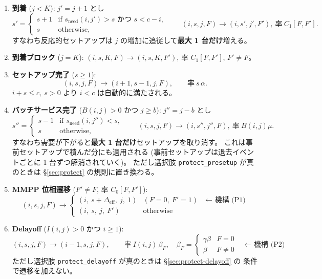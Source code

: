 \documentclass[a4paper,11pt]{article}
\newcommand{\code}[1]{\texttt{#1}}
\newcommand{\eff}{\mathrm{eff}}
\begin{document}
\begin{enumerate}
\item \textbf{到着} ($j<K$): $j'=j+1$ とし
  \begin{equation}
    s' = \begin{cases}
      s+1 & \text{if } s_{\mathrm{need}}(i,j')>s \text{ かつ } s<c-i,\\
      s   & \text{otherwise,}
    \end{cases}
    \qquad
    (i,s,j,F)\to(i,s',j',F'),\ \text{率}\ C_1[F,F'].
  \end{equation}
  すなわち反応的セットアップは $j$ の増加に追従して\textbf{最大 1 台だけ}増える。
\item \textbf{到着ブロック} ($j=K$): $(i,s,K,F)\to(i,s,K,F')$, 率 $C_1[F,F']$, $F'\ne F$。
\item \textbf{セットアップ完了} ($s\ge1$):
  \begin{equation}
    (i,s,j,F)\to(i+1,s-1,j,F),\qquad \text{率}\ s\,\alpha .
  \end{equation}
  $i+s\le c,\ s>0$ より $i<c$ は自動的に満たされる。
\item \textbf{バッチサービス完了} ($B(i,j)>0$ かつ $j\ge b$): $j''=j-b$ とし
  \begin{equation}
    s''=\begin{cases} s-1 & \text{if } s_{\mathrm{need}}(i,j'')<s,\\ s & \text{otherwise,}\end{cases}
    \qquad (i,s,j,F)\to(i,s'',j'',F),\ \text{率}\ B(i,j)\mu .
  \end{equation}
  すなわち需要が下がると\textbf{最大 1 台だけ}セットアップを取り消す。
  これは事前セットアップで積んだ分にも適用される
  (事前セットアップは退去イベントごとに 1 台ずつ解消されていく)。
  ただし選択肢 \code{protect\_presetup} が真のときは \S\ref{sec:protect} の規則に置き換わる。
\item \textbf{MMPP 位相遷移} ($F'\ne F$, 率 $C_0[F,F']$):
  \begin{equation}
    (i,s,j,F)\to
    \begin{cases}
      (i,\ s+\Delta_{\eff},\ j,\ 1) & (F=0,\ F'=1) \quad\text{← 機構 (P1)}\\
      (i,\ s,\ j,\ F')              & \text{otherwise}
    \end{cases}
  \end{equation}
\item \textbf{Delayoff} ($I(i,j)>0$ かつ $i\ge1$):
  \begin{equation}
    (i,s,j,F)\to(i-1,s,j,F),\qquad
    \text{率}\ I(i,j)\,\beta_F,\quad
    \beta_F=\begin{cases}\gamma\beta & F=0\\ \beta & F\ne0\end{cases}
    \quad\text{← 機構 (P2)}
  \end{equation}
  ただし選択肢 \code{protect\_delayoff} が真のときは \S\ref{sec:protect-delayoff} の
  条件で遷移を加えない。
\end{enumerate}
\end{document}
